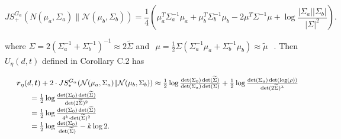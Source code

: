 \[
J S _ { + } ^ { G _ { \alpha } } ( N ( \mu _ { a } , \Sigma _ { a } ) \| \mathcal { N } ( \mu _ { b } , \Sigma _ { b } ) ) = \frac 1 4 \left( \mu _ { a } ^ { T } \Sigma _ { a } ^ { - 1 } \mu _ { a } + \mu _ { b } ^ { T } \Sigma _ { b } ^ { - 1 } \mu _ { b } - 2 \mu ^ { T } \Sigma ^ { - 1 } \mu + \log \frac { | \Sigma _ { a } | | \Sigma _ { b } | } { | \Sigma | ^ { 2 } } \right) .
\]

where
\(\Sigma = 2 ( \Sigma _ { a } ^ { - 1 } + \Sigma _ { b } ^ { - 1 } ) ^ { - 1 } \approx 2 \widetilde \Sigma\)
and
\(\begin{array} { r } { \mu = \frac { 1 } { 2 } \Sigma ( \Sigma _ { a } ^ { - 1 } \mu _ { a } + \Sigma _ { b } ^ { - 1 } \mu _ { b } ) \approx \widetilde { \mu } } \end{array}\)
. Then \(U _ { \eta } ( d , t )\) defined in Corollary C.2 has

\[
\begin{array} { r l } & { \boldsymbol { r } _ { \eta } ( d , \boldsymbol { t } ) + 2 \cdot J S _ { * } ^ { G _ { \alpha } } ( \mathcal { N } ( \mu _ { a } , \Sigma _ { a } ) \| \mathcal { N } ( \mu _ { b } , \Sigma _ { b } ) ) \approx \frac { 1 } { 2 } \log \frac { \operatorname* { d e t } ( \Sigma _ { 0 } ) \operatorname* { d e t } ( \widetilde { \Sigma } ) } { \operatorname* { d e t } ( \Sigma _ { a } ) \operatorname* { d e t } ( \Sigma ) } + \frac { 1 } { 2 } \log \frac { \operatorname* { d e t } ( \Sigma _ { a } ) \operatorname* { d e t } ( \log ( \rho ) ) } { \operatorname* { d e t } ( 2 \widetilde { \Sigma } ) ^ { \lambda } } } \\ & { \qquad = \frac { 1 } { 2 } \log \frac { \operatorname* { d e t } ( \Sigma _ { 0 } ) \operatorname* { d e t } ( \widetilde { \Sigma } ) } { \operatorname* { d e t } ( 2 \widetilde { \Sigma } ) ^ { 2 } } } \\ & { \qquad = \frac { 1 } { 2 } \log \frac { \operatorname* { d e t } ( \Sigma _ { 0 } ) \operatorname* { d e t } ( \widetilde { \Sigma } ) } { 4 ^ { k } \cdot \operatorname* { d e t } ( \widetilde { \Sigma } ) ^ { 2 } } } \\ & { \qquad = \frac { 1 } { 2 } \log \frac { \operatorname* { d e t } ( \Sigma _ { 0 } ) } { \operatorname* { d e t } ( \widetilde { \Sigma } ) } - k \log 2 . } \end{array}
\]

